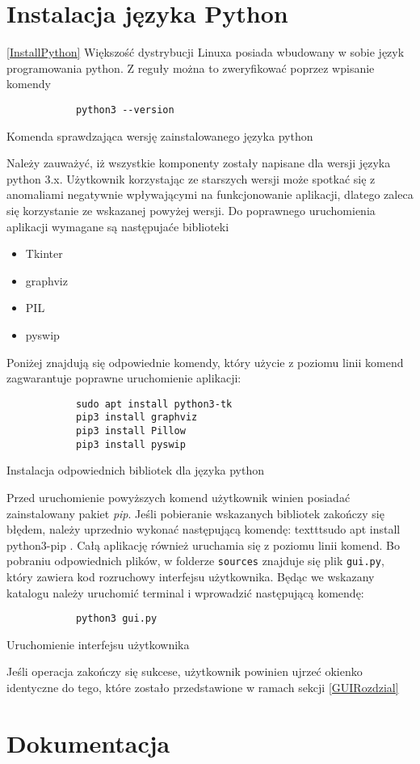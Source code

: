\section{Instalacja języka Python}
    \ref{InstallPython}
    Większość dystrybucji Linuxa posiada wbudowany w sobie język programowania python. Z reguły można to zweryfikować poprzez wpisanie komendy 
    \begin{listing}[H]
        \begin{verbatim}
            python3 --version
        \end{verbatim}
        \caption{Komenda sprawdzająca wersję zainstalowanego języka python}
    \end{listing}
    Należy zauważyć, iż wszystkie komponenty zostały napisane dla wersji języka python 3.x. Użytkownik korzystając ze starszych wersji 
    może spotkać się z anomaliami negatywnie wpływającymi na funkcjonowanie aplikacji, dlatego zaleca się korzystanie ze wskazanej powyżej wersji.
    Do poprawnego uruchomienia aplikacji wymagane są następujaće biblioteki 
    \begin{itemize}
        \item Tkinter
        \item graphviz 
        \item PIL
        \item pyswip
    \end{itemize}
    Poniżej znajdują się odpowiednie komendy, który użycie z poziomu linii komend zagwarantuje poprawne uruchomienie aplikacji:
    \begin{listing}[H]
        \begin{verbatim}
            sudo apt install python3-tk
            pip3 install graphviz
            pip3 install Pillow
            pip3 install pyswip
        \end{verbatim}
        \caption{Instalacja odpowiednich bibliotek dla języka python}
    \end{listing}
    Przed uruchomienie powyższych komend użytkownik winien posiadać zainstalowany pakiet \textit{pip}. Jeśli pobieranie wskazanych bibliotek zakończy 
    się błędem, należy uprzednio wykonać następującą komendę: texttt{sudo apt install python3-pip} .
    Całą aplikację również uruchamia się z poziomu linii komend. Bo pobraniu odpowiednich plików, w folderze \texttt{sources} znajduje się plik
    \texttt{gui.py}, który zawiera kod rozruchowy interfejsu użytkownika. Będąc we wskazany katalogu należy uruchomić terminal i wprowadzić następującą
    komendę:
    \begin{listing}[H]
        \begin{verbatim}
            python3 gui.py
        \end{verbatim}
        \caption{Uruchomienie interfejsu użytkownika}
    \end{listing}
    Jeśli operacja zakończy się sukcese, użytkownik powinien ujrzeć okienko identyczne do tego, które zostało przedstawione w ramach sekcji \ref{GUIRozdzial}

\section{Dokumentacja}

